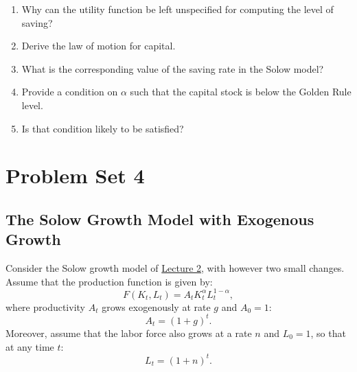 \documentclass[]{book}
\begin{document}
\begin{enumerate}
\def\labelenumi{\arabic{enumi}.}
\item
  Why can the utility function be left unspecified for computing the
  level of saving?
\item
  Derive the law of motion for capital.
\item
  What is the corresponding value of the saving rate in the Solow model?
\item
  Provide a condition on \(\alpha\) such that the capital stock is below
  the Golden Rule level.
\item
  Is that condition likely to be satisfied?
\end{enumerate}

\hypertarget{pset4}{\chapter{Problem Set 4}\label{pset4}}

\section{The Solow Growth Model with Exogenous
Growth}\label{the-solow-growth-model-with-exogenous-growth}

Consider the Solow growth model of \protect\hyperlink{solow}{Lecture 2},
with however two small changes. Assume that the production function is
given by: \[F(K_t,L_t)=A_t K_t^{\alpha} L_t^{1-\alpha},\] where
productivity \(A_t\) grows exogenously at rate \(g\) and \(A_0=1\):
\[A_t=(1+g)^t.\] Moreover, assume that the labor force also grows at a
rate \(n\) and \(L_0=1\), so that at any time \(t\): \[ L_t = (1+n)^t.\]
\end{document}
